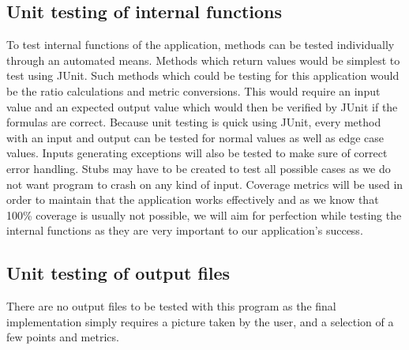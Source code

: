 \documentclass[12pt, titlepage]{article}
\begin{document}
\subsection{Unit testing of internal functions}

To test internal functions of the application, methods can be tested individually through an automated means. Methods which return values would be simplest to test using {\color{red}JUnit}. Such methods which could be testing for this application would be the ratio calculations and metric conversions. This would require an input value and an expected output value which would then be verified by {\color{red}JUnit} if the formulas are correct. Because unit testing is quick using {\color{red}JUnit}, every method with an input and output can be tested for normal values as well as edge case values. Inputs generating exceptions will also be tested to make sure of correct error handling. Stubs may have to be created to test all possible cases as we do not want program to crash on any kind of input. Coverage metrics will be used in order to maintain that the application works effectively and as we know that 100\% coverage is usually not possible, we will aim for perfection while testing the internal functions as they are very important to our application’s success. 
		
\subsection{Unit testing of output files}

There are no output files to be tested with this program as the final implementation simply requires a picture taken by the user, and a selection of a few points and metrics.	



\newpage
\end{document}
